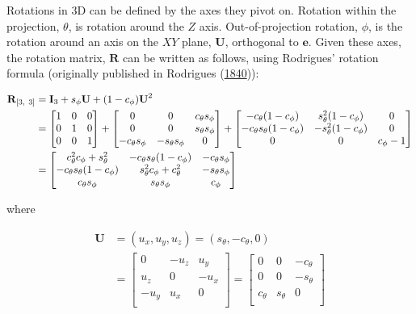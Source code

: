 Rotations in 3D can be defined by the axes they pivot on. Rotation
within the projection, \(\theta\), is rotation around the \(Z\) axis.
Out-of-projection rotation, \(\phi\), is the rotation around an axis on
the \(XY\) plane, \(\textbf{U}\), orthogonal to \(\textbf{e}\). Given
these axes, the rotation matrix, \(\textbf{R}\) can be written as
follows, using Rodrigues' rotation formula (originally published in
Rodrigues (\protect\hyperlink{ref-rodrigues_lois_1840}{1840})):

\begin{align*}
    \textbf{R}_{[3,~3]} 
    &= \textbf{I}_3 + s_\phi\*\textbf{U} + (1-c_\phi)\*\textbf{U}^2 \\
        &=
    \begin{bmatrix}
      1 & 0 & 0 \\ 
      0 & 1 & 0 \\ 
      0 & 0 & 1 \\
    \end{bmatrix} +
    \begin{bmatrix}
      0 & 0 & c_\theta s_\phi \\
      0 & 0 & s_\theta s_\phi \\
      -c_\theta s_\phi & -s_\theta s_\phi & 0 \\
    \end{bmatrix} +
    \begin{bmatrix}
      -c_\theta (1-c_\phi) & s^2_\theta (1-c_\phi) & 0 \\
      -c_\theta s_\theta (1-c_\phi) & -s^2_\theta (1-c_\phi) & 0 \\
      0 & 0 & c_\phi-1 \\
    \end{bmatrix} \\
    &= 
    \begin{bmatrix}
      c_\theta^2 c_\phi + s_\theta^2 &
      -c_\theta s_\theta (1 - c_\phi) &
      -c_\theta s_\phi \\
      -c_\theta s_\theta (1 - c_\phi) &
      s_\theta^2 c_\phi + c_\theta^2 &
      -s_\theta s_\phi \\
      c_\theta s_\phi &
      s_\theta s_\phi &
      c_\phi
    \end{bmatrix} \\
\end{align*}

\noindent where

\begin{align*}
  \textbf{U} &= (u_x, u_y, u_z) =
  (s_\theta, -c_\theta, 0) \\ 
  &=
  \begin{bmatrix}
  0 & -u_z & u_y  \\
  u_z & 0 & -u_x \\
  -u_y & u_x & 0 \\
  \end{bmatrix} =
  \begin{bmatrix}
    0 & 0 & -c_\theta \\
    0 & 0 & -s_\theta \\
    c_\theta & s_\theta & 0 \\
  \end{bmatrix} \\
  \end{align*}

